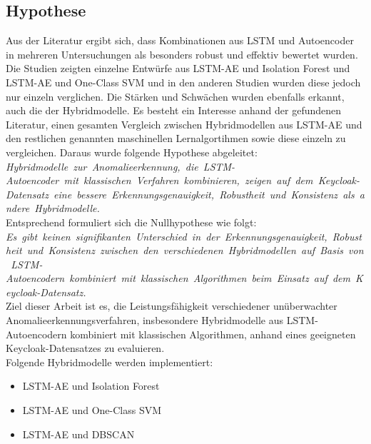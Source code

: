 \documentclass[a4paper,12pt]{article}
\begin{document}
	\subsection{Hypothese}
	Aus der Literatur ergibt sich, dass Kombinationen aus LSTM und \gls{Autoencoder} in mehreren Untersuchungen als besonders robust und effektiv bewertet wurden. Die Studien zeigten einzelne Entwürfe aus LSTM-AE und Isolation Forest und LSTM-AE und One-Class SVM und in den anderen Studien wurden diese jedoch nur einzeln verglichen.
	Die Stärken und Schwächen wurden ebenfalls erkannt, auch die der Hybridmodelle. Es besteht ein Interesse anhand der gefundenen Literatur, einen gesamten Vergleich zwischen Hybridmodellen aus LSTM-AE und den restlichen genannten maschinellen Lernalgortihmen sowie diese einzeln zu vergleichen. 
	Daraus wurde folgende Hypothese abgeleitet:
	\\[0.5em]
	\textit{Hybridmodelle zur Anomalieerkennung, die LSTM-Autoencoder mit klassischen Verfahren kombinieren, zeigen auf dem Keycloak-Datensatz eine bessere Erkennungsgenauigkeit, Robustheit und Konsistenz als andere Hybridmodelle.
	}
	\\[0.5em]
	Entsprechend formuliert sich die Nullhypothese wie folgt:
	\textit{Es gibt keinen signifikanten Unterschied in der Erkennungsgenauigkeit, Robustheit und Konsistenz zwischen den verschiedenen Hybridmodellen auf Basis von LSTM-Autoencodern kombiniert mit klassischen Algorithmen beim Einsatz auf dem Keycloak-Datensatz.
	}
	\\[0.5em]
	Ziel dieser Arbeit ist es, die Leistungsfähigkeit verschiedener unüberwachter Anomalieerkennungsverfahren, insbesondere Hybridmodelle aus LSTM-Autoencodern kombiniert mit klassischen Algorithmen, anhand eines geeigneten Keycloak-Datensatzes zu evaluieren.
	\\[0.5em]
	Folgende Hybridmodelle werden implementiert:
	\begin{itemize}
		\item LSTM-AE und Isolation Forest
		\item LSTM-AE und One-Class SVM
		\item LSTM-AE und DBSCAN
	\end{itemize}
	
\end{document}
